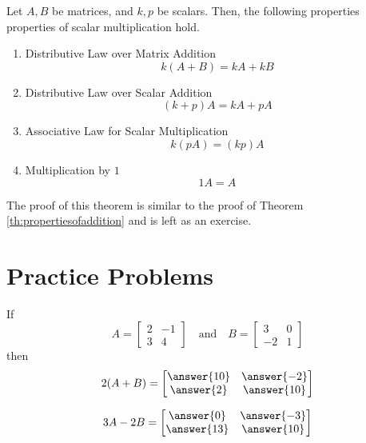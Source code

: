 \documentclass{ximera}
\begin{document}
\begin{theorem}\label{th:propertiesscalarmult}
Let $A, B$ be matrices, and $k, p$ be scalars. Then, the following properties properties of scalar multiplication hold.
\begin{enumerate}
\item\label{item:scalardistmatadd} Distributive Law over Matrix Addition
\begin{equation*}
k \left( A+B\right) =k A+ kB  
\end{equation*}

\item \label{item:matdistscalaradd}Distributive Law over Scalar Addition
\begin{equation*}
\left( k +p \right) A= k A+p A
\end{equation*}

\item \label{item:scalarmatmultass}Associative Law for Scalar Multiplication
\begin{equation*}
k \left( p A\right) = \left( k p \right) A 
\end{equation*}

\item\label{item:matmult1} Multiplication by $1$
\begin{equation*}
1A=A  
\end{equation*}
\end{enumerate}

\end{theorem}

The proof of this theorem is similar to the proof of Theorem \ref{th:propertiesofaddition} and is left as an exercise. 


\section*{Practice Problems}

\begin{problem}\label{prob:matrixops} If 
$$A=\begin{bmatrix}2&-1\\3&4\end{bmatrix}\quad\text{and}\quad B=\begin{bmatrix}3&0\\-2&1\end{bmatrix}$$
then $$2(A+B)=\begin{bmatrix}\answer{10}&\answer{-2}\\\answer{2}&\answer{10}\end{bmatrix}$$

$$3A-2B=\begin{bmatrix}\answer{0}&\answer{-3}\\\answer{13}&\answer{10}\end{bmatrix}$$
\end{problem}
\end{document}

